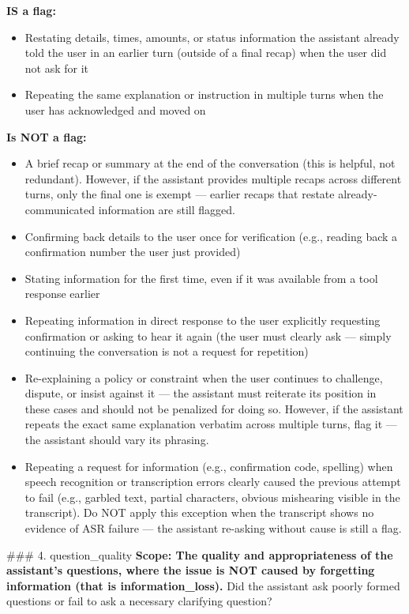 \begin{tcolorbox}[promptbox, title={\small Conversation Progression Prompt}]
      \textbf{IS a flag:}
      \begin{itemize}
        \item Restating details, times, amounts, or status information the assistant already told the user in an earlier turn (outside of a final recap) when the user did not ask for it
        \item Repeating the same explanation or instruction in multiple turns when the user has acknowledged and moved on
      \end{itemize}

      \textbf{Is NOT a flag:}
      \begin{itemize}
        \item A brief recap or summary at the end of the conversation (this is helpful, not redundant). However, if the assistant provides multiple recaps across different turns, only the final one is exempt --- earlier recaps that restate already-communicated information are still flagged.
        \item Confirming back details to the user once for verification (e.g., reading back a confirmation number the user just provided)
        \item Stating information for the first time, even if it was available from a tool response earlier
        \item Repeating information in direct response to the user explicitly requesting confirmation or asking to hear it again (the user must clearly ask --- simply continuing the conversation is not a request for repetition)
        \item Re-explaining a policy or constraint when the user continues to challenge, dispute, or insist against it --- the assistant must reiterate its position in these cases and should not be penalized for doing so. However, if the assistant repeats the exact same explanation verbatim across multiple turns, flag it --- the assistant should vary its phrasing.
        \item Repeating a request for information (e.g., confirmation code, spelling) when speech recognition or transcription errors clearly caused the previous attempt to fail (e.g., garbled text, partial characters, obvious mishearing visible in the transcript). Do NOT apply this exception when the transcript shows no evidence of ASR failure --- the assistant re-asking without cause is still a flag.
      \end{itemize}

      \#\#\# 4. question\_quality\newline
      \textbf{Scope: The quality and appropriateness of the assistant's questions, where the issue is NOT caused by forgetting information (that is information\_loss).} Did the assistant ask poorly formed questions or fail to ask a necessary clarifying question?\newline


\end{tcolorbox}
